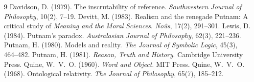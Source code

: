 \documentclass{situationist-preprint}
\begin{document}
\begin{thebibliography}{9}\small
{} Davidson, D. (1979). The inscrutability of reference. \emph{Southwestern Journal of Philosophy}, 10(2), 7--19.
 Devitt, M. (1983). Realism and the renegade Putnam: A critical study of \emph{Meaning and the Moral Sciences}. \emph{No\^us}, 17(2), 291--301.
 Lewis, D. (1984). Putnam's paradox. \emph{Australasian Journal of Philosophy}, 62(3), 221--236.
 Putnam, H. (1980). Models and reality. \emph{The Journal of Symbolic Logic}, 45(3), 464--482.
 Putnam, H. (1981). \emph{Reason, Truth and History}. Cambridge University Press.
 Quine, W.~V.~O. (1960). \emph{Word and Object}. MIT Press.
 Quine, W.~V.~O. (1968). Ontological relativity. \emph{The Journal of Philosophy}, 65(7), 185--212.
\end{thebibliography}
\end{document}
